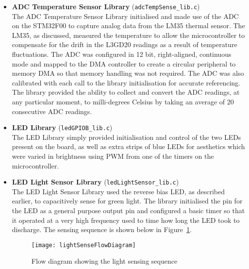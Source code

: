  \begin{itemize}
    \item \textbf{ADC Temperature Sensor Library} (\texttt{adcTempSense\_lib.c})\\
    The ADC Temperature Sensor Library initialised and made use of the ADC on the STM32F00 to capture analog data from the LM35 thermal sensor. The LM35, as discussed, measured the temperature to allow the microcontroller to compensate for the drift in the L3GD20 readings as a result of temperature fluctuations. The ADC was configured in 12 bit, right-aligned, continuous mode and mapped to the DMA controller to create a circular peripheral to memory DMA so that memory handling was not required. The ADC was also calibrated with each call to the library initialisation for accurate referencing.\\

    The library provided the ability to collect and convert the ADC readings, at any particular moment, to milli-degrees Celsius by taking an average of 20 consecutive ADC readings.

    \item \textbf{LED Library} (\texttt{ledGPIOB\_lib.c})\\
    The LED Library simply provided initialisation and control of the two LEDs present on the board, as well as extra strips of blue LEDs for aesthetics which were varied in brightness using PWM from one of the timers on the microcontroller.

    \item \textbf{LED Light Sensor Library} (\texttt{ledLightSensor\_lib.c})\\
    The LED Light Sensor Library used the reverse bias LED, as described earlier, to capacitively sense for green light. The library initialised the pin for the LED as a general purpose output pin and configured a basic timer so that it operated at a very high frequency used to time how long the LED took to discharge. The sensing sequence is shown below in Figure~\ref{fig:lightSenseFlowDiagram}.

    \begin{figure}[H]
      \begin{center}
        \texttt{[image: lightSenseFlowDiagram]}
        \caption{Flow diagram showing the light sensing sequence}
        \label{fig:lightSenseFlowDiagram}
      \end{center}
    \end{figure}


\end{itemize}
